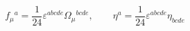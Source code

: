 \begin{equation}
f_\mu{}^a = \frac{1}{24} \varepsilon^{abcde} \Omega_\mu{}^{bcde},
\qquad \eta^a = \frac{1}{24} \varepsilon^{abcde} \eta_{bcde}
\end{equation}

